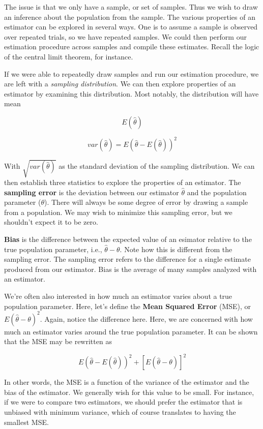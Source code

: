 \documentclass[
]{book}
\begin{document}
The issue is that we only have a sample, or set of samples. Thus we wish to draw an inference about the population from the sample. The various properties of an estimator can be explored in several ways. One is to assume a sample is observed over repeated trials, so we have repeated samples. We could then perform our estimation procedure across samples and compile these estimates. Recall the logic of the central limit theorem, for instance.

If we were able to repeatedly draw samples and run our estimation procedure, we are left with a \textit{sampling distribution}. We can then explore properties of an estimator by examining this distribution. Most notably, the distribution will have mean

\[E(\hat {\theta})\]

\[var(\hat{\theta})=E(\hat{\theta}-E(\hat{\theta}))^2\]

With \(\sqrt{var(\hat{\theta})}\) as the standard deviation of the sampling distribution. We can then establish three statistics to explore the properties of an estimator. The \textbf{sampling error} is the deviation between our estimator \(\hat{\theta}\) and the population parameter (\(\theta\)). There will always be some degree of error by drawing a sample from a population. We may wish to minimize this sampling error, but we shouldn't expect it to be zero.

\textbf{Bias} is the difference between the expected value of an esimator relative to the true population parameter, i.e., \(\hat{\theta}-\theta\). Note how this is different from the sampling error. The sampling error refers to the difference for a single estimate produced from our estimator. Bias is the average of many samples analyzed with an estimator.

We're often also interested in how much an estimator varies about a true population parameter. Here, let's define the \textbf{Mean Squared Error} (MSE), or \(E(\hat{\theta}-\theta)^2\). Again, notice the difference here. Here, we are concerned with how much an estimator varies around the true population parameter. It can be shown that the MSE may be rewritten as

\[E(\hat{\theta}-E(\hat{\theta}))^2 +[E(\hat{\theta}-\theta)]^2\]

In other words, the MSE is a function of the variance of the estimator and the bias of the estimator. We generally wish for this value to be small. For instance, if we were to compare two estimators, we should prefer the estimator that is unbiased with minimum variance, which of course translates to having the smallest MSE.
\end{document}
